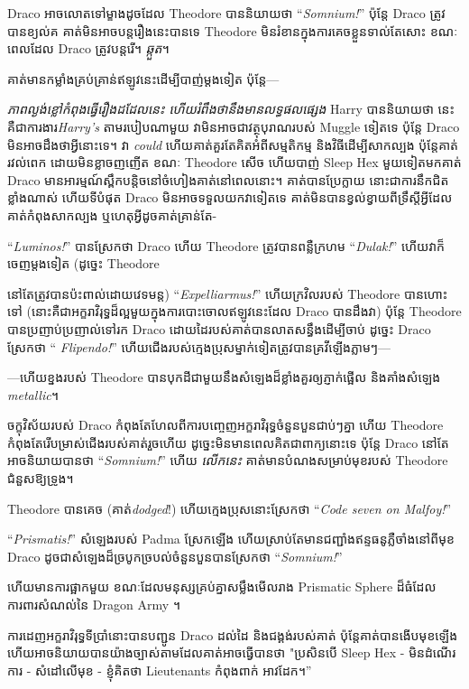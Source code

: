 {Draco អាចលោតទៅម្ខាងដូចដែល Theodore បាននិយាយថា “\emph{Somnium!}” ប៉ុន្តែ Draco ត្រូវបានខ្យល់គ គាត់មិនអាចបន្តរឿងនេះបានទេ Theodore មិនរំខានក្នុងការគេចខ្លួនទាល់តែសោះ ខណៈពេលដែល Draco ត្រូវបន្តរើ។ \emph{ឆ្កួត}។

គាត់​មាន​កម្លាំង​គ្រប់គ្រាន់​ឥឡូវ​នេះ​ដើម្បី​បាញ់​ម្ដង​ទៀត ប៉ុន្តែ—

\emph{ភាពល្ងង់ខ្លៅកំពុងធ្វើរឿងដដែលនេះ ហើយរំពឹងថានឹងមានលទ្ធផលផ្សេង} Harry បាននិយាយថា នេះគឺជាការងារ\emph{Harry's} តាមរបៀបណាមួយ វាមិនអាចជាវត្ថុបុរាណរបស់ Muggle ទៀតទេ ប៉ុន្តែ Draco មិនអាចដឹងថាអ្វីនោះទេ។ វា \emph{could} ហើយគាត់គួរតែគិតអំពីសម្មតិកម្ម និងវិធីដើម្បីសាកល្បង ប៉ុន្តែគាត់រវល់ពេក ដោយមិនខ្លាចញញើត ខណៈ Theodore សើច ហើយបាញ់ Sleep Hex មួយទៀតមកគាត់ Draco មានអារម្មណ៍ស្ពឹកបន្តិចនៅចំហៀងគាត់នៅពេលនោះ។ គាត់បានប្រែក្លាយ នោះជាការនឹកជិតខ្លាំងណាស់ ហើយទីបំផុត Draco មិនអាចទទួលយកវាទៀតទេ គាត់មិនបានខ្វល់ខ្វាយពីទ្រឹស្តីអ្វីដែលគាត់កំពុងសាកល្បង ឬហេតុអ្វីដូចគាត់គ្រាន់តែ-

“\emph{Luminos!}” បានស្រែកថា Draco ហើយ Theodore ត្រូវបានពន្លឺក្រហម “\emph{Dulak!}” ហើយវាក៏ចេញម្តងទៀត (ដូច្នេះ Theodore \emph{}} នៅតែត្រូវបានប៉ះពាល់ដោយវេទមន្ត) “\emph{Expelliarmus!}” ហើយក្រវិលរបស់ Theodore បានហោះទៅ (នោះគឺជាអក្ខរាវិរុទ្ធដ៏ល្អមួយក្នុងការបោះចោលឥឡូវនេះដែល Draco បានដឹងវា) ប៉ុន្តែ Theodore បានប្រញាប់ប្រញាល់ទៅរក Draco ដោយដៃរបស់គាត់បានលាតសន្ធឹងដើម្បីចាប់ ដូច្នេះ Draco ស្រែកថា “\emph{ Flipendo!}” ហើយជើងរបស់ក្មេងប្រុសម្នាក់ទៀតត្រូវបានគ្រវីឡើងភ្លាមៗ—

—ហើយខ្នងរបស់ Theodore បានបុកដីជាមួយនឹងសំឡេងដ៏ខ្លាំងគួរឲ្យភ្ញាក់ផ្អើល និងគាំងសំឡេង \emph{metallic}។

ចក្ខុវិស័យរបស់ Draco កំពុងតែហែលពីការបញ្ចេញអក្ខរាវិរុទ្ធចំនួនបួនជាប់ៗគ្នា ហើយ Theodore កំពុងតែរើបម្រាស់ជើងរបស់គាត់រួចហើយ ដូច្នេះមិនមានពេលគិតជាពាក្យនោះទេ ប៉ុន្តែ Draco នៅតែអាចនិយាយបានថា “\emph{Somnium!}” ហើយ \emph{លើកនេះ} គាត់មានបំណងសម្រាប់មុខរបស់ Theodore ជំនួសឱ្យទ្រូង។

Theodore បានគេច (គាត់\emph{dodged}!) ហើយក្មេងប្រុសនោះស្រែកថា “\emph{Code seven on Malfoy!}”

“\emph{Prismatis!}” សំឡេងរបស់ Padma ស្រែកឡើង ហើយស្រាប់តែមានជញ្ជាំងឥន្ទធនូភ្លឺចាំងនៅពីមុខ Draco ដូចជាសំឡេងដ៏ច្របូកច្របល់ចំនួនបួនបានស្រែកថា “\emph{Somnium!}”

ហើយមានការផ្អាកមួយ ខណៈដែលមនុស្សគ្រប់គ្នាសម្លឹងមើលរាង Prismatic Sphere ដ៏ធំដែលការពារសំណល់នៃ Dragon Army ។

ការដេញអក្ខរាវិរុទ្ធទីប្រាំនោះបានបញ្ជូន Draco ដល់ដៃ និងជង្គង់របស់គាត់ ប៉ុន្តែគាត់បានងើបមុខឡើង ហើយអាចនិយាយបានយ៉ាងច្បាស់តាមដែលគាត់អាចធ្វើបានថា "ប្រសិនបើ Sleep Hex - មិនដំណើរការ - សំដៅលើមុខ - ខ្ញុំគិតថា Lieutenants កំពុងពាក់ អាវដែក។”

